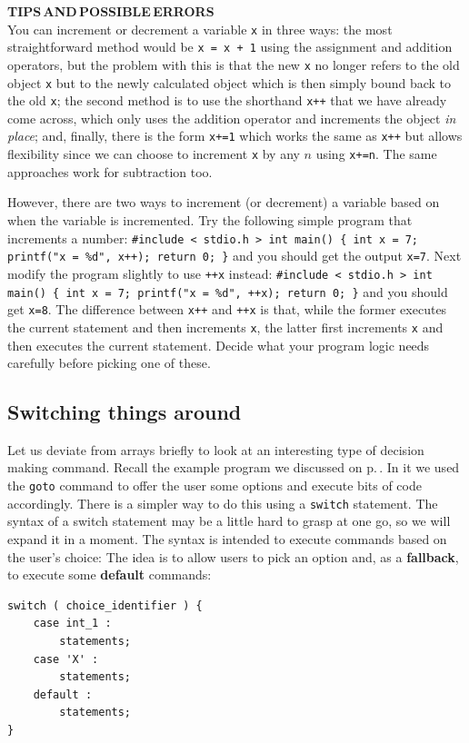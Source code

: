 \documentclass[11pt,oneside]{article}
\newcommand{\eb}[1]{\textbf{\scriptsize{\sffamily\addfontfeatures{LetterSpace=7} #1\\[.35em]}}}
\begin{document}
{{{{{{{{{\begin{errorbox}
\eb{TIPS\;\,AND\;\,POSSIBLE\;\,ERRORS }
You can increment or decrement a variable \verb+x+ in three ways: the most straightforward method would be \texttt{x = x + 1} using the assignment and addition operators, but the problem with this is that the new \verb+x+ no longer refers to the old object \verb+x+ but to the newly calculated object which is then simply bound back to the old \verb+x+; the second method is to use the shorthand \texttt{x++} that we have already come across, which only uses the addition operator and increments the object \textit{in place}; and, finally, there is the form \texttt{x+=1} which works the same as \texttt{x++} but allows flexibility since we can choose to increment \verb+x+ by any $n$ using \texttt{x+=n}. The same approaches work for subtraction too.

\hspace*{0.5cm} However, there are two ways to increment (or decrement) a variable based on when the variable is incremented. Try the following simple program that increments a number: \verb!#include < stdio.h > int main() { int x = 7; printf("x = %d", x++); return 0; }! and you should get the output \verb+x=7+. Next modify the program slightly to use \verb!++x! instead: \verb!#include < stdio.h > int main() { int x = 7; printf("x = %d", ++x); return 0; }! and you should get \verb+x=8+. The difference between \texttt{x++} and \texttt{++x} is that, while the former executes the current statement and then increments \verb+x+, the latter first increments \verb+x+ and then executes the current statement. Decide what your program logic needs carefully before picking one of these.

\end{errorbox}

\subsection{Switching things around}\label{sec:switching-things-around}

Let us deviate from arrays briefly to look at an interesting type of decision making command. Recall the example program we discussed on p.\,\pageref{functions_example.c}. In it we used the \verb+goto+ command to offer the user some options and execute bits of code accordingly. There is a simpler way to do this using a \verb+switch+ statement. The syntax of a switch statement may be a little hard to grasp at one go, so we will expand it in a moment. The syntax is intended to execute commands based on the user's choice:  The idea is to allow users to pick an option and, as a \textbf{fallback}, to execute some \textbf{default} commands: \vspace{-1cm}
\begin{lstlisting}
switch ( choice_identifier ) {
    case int_1 : 
        statements;
    case 'X' :
        statements;
    default :
        statements;
}
\end{lstlisting}

}}}}}}}}}
\end{document}
